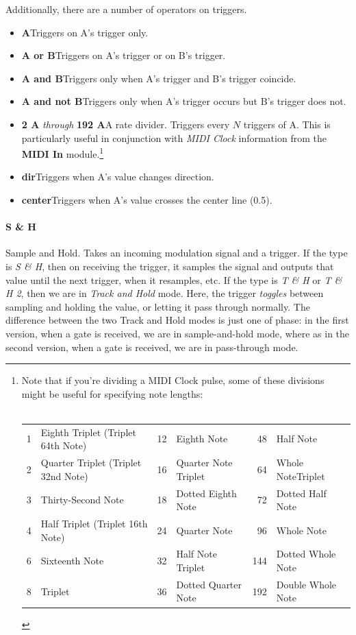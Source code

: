 \documentclass{article}
\begin{document}
\noindent Additionally, there are a number of operators on triggers.

\begin{itemize}
\item {\bf A}\quad Triggers on A's trigger only.
\item {\bf A or B}\quad Triggers on A's trigger or on B's trigger.
\item {\bf A and B}\quad Triggers only when A's trigger and B's trigger coincide.
\item {\bf A and not B}\quad Triggers only when A's trigger occurs but B's trigger does not.
\item {\bf 2 A} {\it through} {\bf 192 A}\quad A rate divider.  Triggers every \(N\) triggers of A.  This is particularly useful in conjunction with {\it MIDI Clock} information from the {\bf MIDI In} module.\footnote{Note that if you're dividing a MIDI Clock pulse, some of these divisions might be useful for specifying note lengths:\\
\\
\begin{tabular}{rlrlrl}
	1&	Eighth Triplet (Triplet 64th Note)	&12&	Eighth Note							&48&	Half Note		\\
	2&	Quarter Triplet (Triplet 32nd Note)	&16&	Quarter Note Triplet					&64&	Whole NoteTriplet\\
	3&	Thirty-Second Note				&18&	Dotted Eighth Note				&72&	Dotted Half Note\\
	4&	Half Triplet (Triplet 16th Note)		&24&	Quarter Note				&96&	Whole Note\\
	6&	Sixteenth Note					&32&	Half Note Triplet				&144&	Dotted Whole Note\\
	8&	Triplet								&36&	Dotted Quarter Note									&192&	Double Whole Note\\
\end{tabular}\vspace{1em}
}
\item{\bf dir}\quad Triggers when A's value changes direction.
\item{\bf center}\quad Triggers when A's value crosses the center line (0.5).
\end{itemize}

\paragraph{S \& H}  Sample and Hold.  Takes an incoming modulation signal and a trigger.  If the type is {\it S \& H}, then on receiving the trigger, it samples the signal and outputs that value until the next trigger, when it resamples, etc.  If the type is {\it T \& H} or {\it T \& H 2}, then we are in {\it Track and Hold} mode.  Here, the trigger {\it toggles} between sampling and holding the value, or letting it pass through normally.  The difference between the two Track and Hold modes is just one of phase: in the first version, when a gate is received, we are in sample-and-hold mode, where as in the second version, when a gate is received, we are in pass-through mode.
\end{document}
